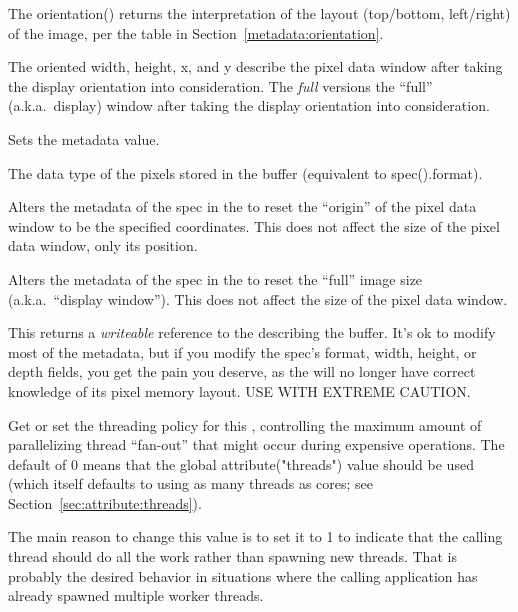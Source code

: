 The {\cf orientation()} returns the interpretation of the layout
(top/bottom, left/right) of the image, per the table in
Section~\ref{metadata:orientation}.

The oriented width, height, x, and y describe the pixel data window
after taking the display orientation into consideration.  The
\emph{full} versions the ``full'' (a.k.a.\ display) window after taking
the display orientation into consideration.
\apiend

Sets the  metadata value.
\apiend

The data type of the pixels stored in the buffer (equivalent to
{\cf spec().format}).
\apiend

Alters the metadata of the spec in the \ImageBuf to reset the ``origin''
of the pixel data window to be the specified coordinates.  This does not
affect the size of the pixel data window, only its position.
\apiend

Alters the metadata of the spec in the \ImageBuf to reset the ``full''
image size (a.k.a.\ ``display window'').  This does not affect the size
of the pixel data window.
\apiend

This returns a \emph{writeable} reference to the \ImageSpec describing
the buffer.  It's ok to modify most of the metadata, but if you modify
the spec's {\cf format}, {\cf width}, {\cf height}, or {\cf depth}
fields, you get the pain you deserve, as the \ImageBuf will no longer
have correct knowledge of its pixel memory layout.  USE WITH EXTREME
CAUTION.
\apiend

Get or set the threading policy for this \ImageBuf, controlling the
maximum amount of parallelizing thread ``fan-out'' that might occur during
expensive operations. The default of 0 means that the global
{\cf attribute("threads")} value should be used (which itself defaults to
using as many threads as cores; see Section~\ref{sec:attribute:threads}).

The main reason to change this value is to set it to 1 to indicate that the
calling thread should do all the work rather than spawning new threads. That
is probably the desired behavior in situations where the calling application
has already spawned multiple worker threads.
\apiend


